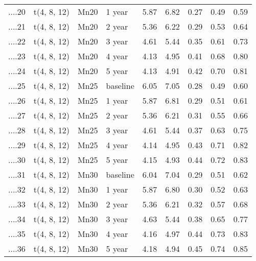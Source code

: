 \begin{table}[ht]
\begin{tabular}{rlllrrrrr}
  ....20 & t(4, 8, 12) & Mn20 & 1 year & 5.87 & 6.82 & 0.27 & 0.49 & 0.59 \\ 
  ....21 & t(4, 8, 12) & Mn20 & 2 year & 5.36 & 6.22 & 0.29 & 0.53 & 0.64 \\ 
  ....22 & t(4, 8, 12) & Mn20 & 3 year & 4.61 & 5.44 & 0.35 & 0.61 & 0.73 \\ 
  ....23 & t(4, 8, 12) & Mn20 & 4 year & 4.13 & 4.95 & 0.41 & 0.68 & 0.80 \\ 
  ....24 & t(4, 8, 12) & Mn20 & 5 year & 4.13 & 4.91 & 0.42 & 0.70 & 0.81 \\ 
  ....25 & t(4, 8, 12) & Mn25 & baseline & 6.05 & 7.05 & 0.28 & 0.49 & 0.60 \\ 
  ....26 & t(4, 8, 12) & Mn25 & 1 year & 5.87 & 6.81 & 0.29 & 0.51 & 0.61 \\ 
  ....27 & t(4, 8, 12) & Mn25 & 2 year & 5.36 & 6.21 & 0.31 & 0.55 & 0.66 \\ 
  ....28 & t(4, 8, 12) & Mn25 & 3 year & 4.61 & 5.44 & 0.37 & 0.63 & 0.75 \\ 
  ....29 & t(4, 8, 12) & Mn25 & 4 year & 4.14 & 4.95 & 0.43 & 0.71 & 0.82 \\ 
  ....30 & t(4, 8, 12) & Mn25 & 5 year & 4.15 & 4.93 & 0.44 & 0.72 & 0.83 \\ 
  ....31 & t(4, 8, 12) & Mn30 & baseline & 6.04 & 7.04 & 0.29 & 0.51 & 0.62 \\ 
  ....32 & t(4, 8, 12) & Mn30 & 1 year & 5.87 & 6.80 & 0.30 & 0.52 & 0.63 \\ 
  ....33 & t(4, 8, 12) & Mn30 & 2 year & 5.36 & 6.21 & 0.32 & 0.57 & 0.68 \\ 
  ....34 & t(4, 8, 12) & Mn30 & 3 year & 4.63 & 5.44 & 0.38 & 0.65 & 0.77 \\ 
  ....35 & t(4, 8, 12) & Mn30 & 4 year & 4.16 & 4.97 & 0.44 & 0.73 & 0.83 \\ 
  ....36 & t(4, 8, 12) & Mn30 & 5 year & 4.18 & 4.94 & 0.45 & 0.74 & 0.85 \\ 
   \hline
\end{tabular}
\end{table}
